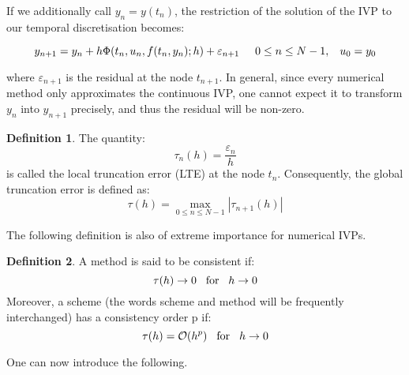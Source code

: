 \documentclass[11pt]{article}
\theoremstyle{theorem}
\theoremstyle{definition}
\newtheorem{definition}{Definition}
\begin{document}
If we additionally call $y_n=y(t_n)$, the restriction of the solution of the IVP to our
temporal discretisation becomes:

$$y_{n+1}=y_n+h\Phi(t_n,u_n,f(t_n, y_n);h)+\varepsilon_{n+1}\hspace{5mm}0\le n\le N-1,\hspace{3mm}u_0=y_0$$

where $\varepsilon_{n+1}$ is the residual at the node $t_{n+1}$. In general, since every numerical method only approximates the continuous IVP, one cannot expect it to transform $y_n$ into $y_{n+1}$ precisely, and thus the residual will be non-zero.\\

\begin{definition}
	\label{def:truncation-error}
	The quantity:
	\begin{equation}
		\label{eqn:local-truncation-error}
		\tau_n(h)=\frac{\varepsilon_n}{h}
	\end{equation}
	is called the local truncation error (LTE) at the node $t_n$. Consequently, the global truncation error is defined as:
	\begin{equation}
	\label{eqn:global-truncation-error}
	\tau(h)=\max\limits_{0\le n\le N-1}|\tau_{n+1}(h)|
	\end{equation}
\end{definition}

The following definition is also of extreme importance for numerical IVPs.

\begin{definition}
	\label{def:consistency}
	A method is said to be consistent if:
	$$\tau(h)\rightarrow 0\hspace{3mm}\text{for}\hspace{3mm}h\rightarrow 0$$
	Moreover, a scheme (the words scheme and method will be frequently interchanged) has a consistency order p if:
	$$\tau(h)=\mathcal{O}(h^p)\hspace{3mm}\text{for}\hspace{3mm}h\rightarrow 0$$
\end{definition}

One can now introduce the following.
\end{document}
